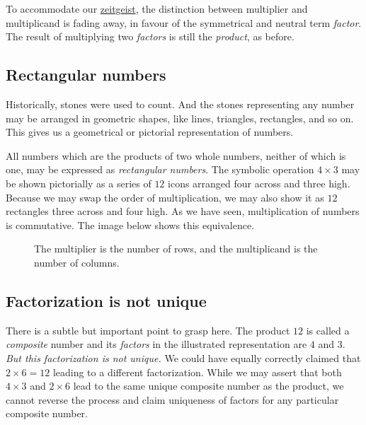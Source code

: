 \documentclass[
  a4paper,
]{article}
\begin{document}
To accommodate our
\href{https://www.thefreedictionary.com/zeitgeist}{zeitgeist}, the
distinction between multiplier and multiplicand is fading away, in
favour of the symmetrical and neutral term \emph{factor}. The result of
multiplying two \emph{factors} is still the \emph{product}, as before.

\hypertarget{rectangular-numbers}{%
\subsection{Rectangular numbers}\label{rectangular-numbers}}

Historically, stones were used to count. And the stones representing any
number may be arranged in geometric shapes, like lines, triangles,
rectangles, and so on. This gives us a geometrical or pictorial
representation of numbers.

All numbers which are the products of two whole numbers, neither of
which is one, may be expressed as \emph{rectangular numbers}. The
symbolic operation \(4 \times 3\) may be shown pictorially as a series
of \(12\) icons arranged four across and three high. Because we may swap
the order of multiplication, we may also show it as \(12\) rectangles
three across and four high. As we have seen, multiplication of numbers
is commutative. The image below shows this equivalence.

\begin{figure}
\hypertarget{fig:four-by-three}{%
\centering

\caption{The multiplier is the number of rows, and the multiplicand is
the number of columns.}\label{fig:four-by-three}
}
\end{figure}

\hypertarget{factorization-is-not-unique}{%
\subsection{Factorization is not
unique}\label{factorization-is-not-unique}}

There is a subtle but important point to grasp here. The product \(12\)
is called a \emph{composite} number and its \emph{factors} in the
illustrated representation are \(4\) and \(3\). \emph{But this
factorization is not unique.} We could have equally correctly claimed
that \(2 \times 6 = 12\) leading to a different factorization. While we
may assert that both \(4 \times 3\) and \(2 \times 6\) lead to the same
unique composite number as the product, we cannot reverse the process
and claim uniqueness of factors for any particular composite number.
\end{document}
